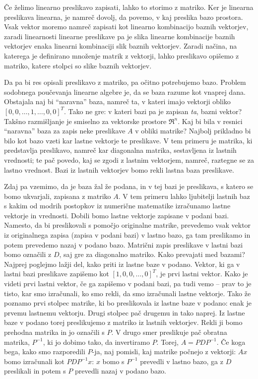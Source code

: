 Če želimo linearno preslikavo zapisati, lahko to storimo z matriko. Ker je linearna preslikava linearna, je namreč dovolj, da povemo, v kaj preslika bazo prostora. Vsak vektor moremo namreč zapisati kot linearno kombinacijo baznih vektorjev, zaradi linearnosti linearne preslikave pa je slika linearne kombinacije baznih vektorjev enaka linearni kombinaciji slik baznih vektorjev. Zaradi načina, na katerega je definirano množenje matrik z vektorji, lahko preslikavo opišemo z matriko, katere stolpci so slike baznih vektorjev.

Da pa bi res opisali preslikavo z matriko, pa očitno potrebujemo bazo. Problem sodobnega poučevanja linearne algebre je, da se baza razume kot vnaprej dana. Obstajala naj bi ``naravna'' baza, namreč ta, v kateri imajo vektorji obliko $[0, 0, \ldots, 1, \ldots, 0, 0]^T$. Tako ne gre: v kateri bazi pa je zapisan {\em ta}, bazni vektor? Takšno razmišljanje je smiselno za vektorske prostore $\Re^n$. Kaj bi bila v resnici ``naravna'' baza za zapis neke preslikave $A$ v obliki matrike? Najbolj prikladno bi bilo kot bazo vzeti kar lastne vektorje te preslikave. V tem primeru je matrika, ki predstavlja preslikavo, namreč kar diagonalna matrika, sestavljena iz lastnih vrednosti; te pač povedo, kaj se zgodi z lastnim vektorjem, namreč, raztegne se za lastno vrednost. Bazi iz lastnih vektorjev bomo rekli lastna baza preslikave.

Zdaj pa vzemimo, da je baza žal že podana, in v tej bazi je preslikava, s katero se bomo ukvarjali, zapisana z matriko $A$. V tem primeru lahko ljubitelji lastnih baz s kakim od modrih postopkov iz numerične matematike izračunamo  lastne vektorje in vrednosti. Dobili bomo lastne vektorje zapisane v podani bazi. Namesto, da bi preslikovali s pomočjo originalne matrike, prevedemo vsak vektor iz originalnega zapisa (zapisa v podani bazi) v lastno bazo, ga tam preslikamo in potem prevedemo nazaj v podano bazo. Matrični zapis preslikave v lastni bazi bomo označili z $D$, saj gre za diagonalno matriko. Kako prevajati med bazami? Najprej poglejmo lažji del, kako priti iz lastne baze v podano. Vektor, ki ga v lastni bazi preslikave zapišemo kot $[1, 0, 0,\ldots, 0]^T$, je prvi lastni vektor. Kako je videti prvi lastni vektor, če ga zapišemo v podani bazi, pa tudi vemo -- prav to je tisto, kar smo izračunali, ko smo rekli, da smo izračunali lastne vektorje. Tako že poznamo prvi stolpec matrike, ki bo preslikovala iz lastne baze v podano: enak je prvemu lastnemu vektorju. Drugi stolpec pač drugemu in tako naprej. Iz lastne baze v podano torej preslikujemo z matriko iz lastnih vektorjev. Rekli ji bomo prehodna matrika in jo označili s $P$. V drugo smer preslikuje pač obratna matrika, $P^{-1}$, ki jo dobimo tako, da invertiramo $P$. Torej, $A = P D P^{-1}$. Če koga bega, kako smo razporedili $P$-ja, naj pomisli, kaj matrike počnejo z vektorji: $Ax$ bomo izračunali kot $P D P^{-1} x$: $x$ bomo s $P^{-1}$ prevedli v lastno bazo, ga z $D$ preslikali in potem s $P$ prevedli nazaj v podano bazo.

